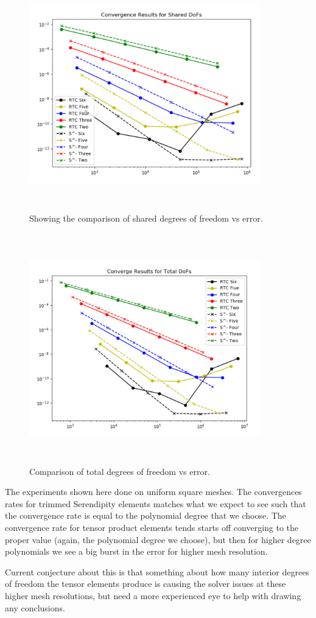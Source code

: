 \documentclass[12pt]{extarticle}
\newcommand{\<}{\langle}
\renewcommand{\>}{\rangle}
\theoremstyle{definition}
\begin{document}
\begin{figure}
    \centering
    \includegraphics[width=10cm,height=10cm]{SharedDoFs.PNG}
    \caption{Showing the comparison of shared degrees of freedom vs error.}
    \label{fig:shared}
\end{figure}

\begin{figure}
    \centering
    \includegraphics[width=10cm,height=10cm]{TotalDoFs.PNG}
    \caption{Comparison of total degrees of freedom vs error.}
    \label{fig:total}
\end{figure}

The experiments shown here done on uniform square meshes.  The convergences rates for trimmed Serendipity elements matches what we expect to see such that the convergence rate is equal to the polynomial degree that we choose.  The convergence rate for tensor product elements tends starts off converging to the proper value (again, the polynomial degree we choose), but then for higher degree polynomials we see a big burst in the error for higher mesh resolution.  

Current conjecture about this is that something about how many interior degrees of freedom the tensor elements produce is causing the solver issues at these higher mesh resolutions, but need a more experienced eye to help with drawing any conclusions.
\end{document}
